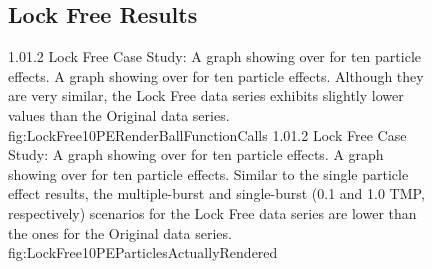 \begin{figure}
\addtocounter{figure}{-1}

\vspace{-1.5cm}
\subsection{Lock Free Results}\label{ssec:studies_unexpected_results_lock_free}

	\vspace{-0.5cm}
	{1.0}{1.2}
	{Lock Free Case Study: A graph showing  over  for ten particle effects.}
	{A graph showing  over  for ten particle effects. Although they are very similar, the Lock Free data series exhibits slightly lower  values than the Original data series.}
	{fig:LockFree10PERenderBallFunctionCalls}
	\vspace{-1.5cm}
	{1.0}{1.2}
	{Lock Free Case Study: A graph showing  over  for ten particle effects.}
	{A graph showing  over  for ten particle effects. Similar to the single particle effect results, the multiple-burst and single-burst (0.1 and 1.0 TMP, respectively) scenarios for the Lock Free data series are lower than the ones for the Original data series.}
	{fig:LockFree10PEParticlesActuallyRendered}

\end{figure}

